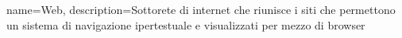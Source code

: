 {
	name={Web},
	description={Sottorete di internet che riunisce i siti che permettono un sistema di navigazione ipertestuale e visualizzati per mezzo di browser}
}